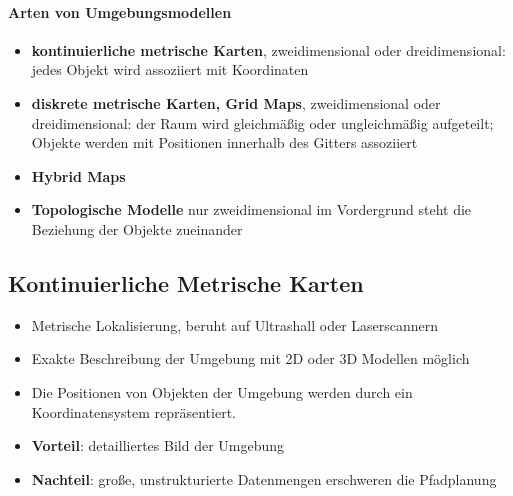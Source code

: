 \paragraph{Arten von Umgebungsmodellen}
\begin{itemize}
	\item \textbf{kontinuierliche metrische Karten}, zweidimensional oder dreidimensional:
	\subitem jedes Objekt wird assoziiert mit Koordinaten
	\item \textbf{diskrete metrische Karten, Grid Maps}, zweidimensional oder dreidimensional:
	\subitem der Raum wird gleichmäßig oder ungleichmäßig aufgeteilt; Objekte werden mit Positionen innerhalb des Gitters assoziiert
	\item \textbf{Hybrid Maps}
	\item \textbf{Topologische Modelle} nur zweidimensional
	\subitem im Vordergrund steht die Beziehung der Objekte zueinander
\end{itemize}
\subsection{Kontinuierliche Metrische Karten}
\begin{itemize}
	\item Metrische Lokalisierung, beruht auf Ultrashall oder Laserscannern
	\item Exakte Beschreibung der Umgebung mit 2D oder 3D Modellen möglich
	\item Die Positionen von Objekten der Umgebung werden durch ein Koordinatensystem repräsentiert.
	\item \textbf{Vorteil}: detailliertes Bild der Umgebung
	\item \textbf{Nachteil}: große, unstrukturierte Datenmengen erschweren die Pfadplanung
\end{itemize}
